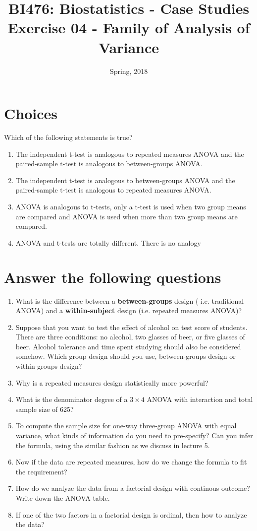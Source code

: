 \documentclass[a4paper,11pt]{article}
\title{\small{BI476: Biostatistics - Case Studies}\\
	\Large{Exercise 04 - Family of Analysis of Variance}
}
\author{Spring, 2018}
\date{}
\begin{document}
\begin{CJK*}{UTF8}{gbsn}
\maketitle


\section{Choices}
Which of the following statements is true?
\begin{enumerate}[A]
	\item The independent t-test is analogous to repeated measures ANOVA and 
		the paired-sample t-test is analogous to between-groups ANOVA.
	\item The independent t-test is analogous to between-groups ANOVA and the 
		paired-sample t-test is analogous to repeated measures ANOVA.
	\item ANOVA is analogous to t-tests, only a t-test is used when two group 
		means are compared and ANOVA is used when more than two group 
		means are compared.
	\item ANOVA and t-tests are totally different. There is no analogy
\end{enumerate}

\section{Answer the following questions}
\begin{enumerate}[(1)]
	\item What is the difference between a \textbf{between-groups} design (
		i.e. traditional ANOVA) and a \textbf{within-subject} design (i.e. 
		repeated measures ANOVA)?
	\item Suppose that you want to test the effect of alcohol on test score of 
		students. There are three conditions: no alcohol, two glasses of 
		beer, or five glasses of beer. Alcohol tolerance and time spent 
		studying should also be considered somehow. Which group design should 
		you use, between-groups design or within-groups design?
	\item Why is a repeated measures design statistically more powerful?
	\item What is the denominator degree of a $3\times 4$ ANOVA with interaction and 
		total sample size of 625? 
	\item To compute the sample size for one-way three-group ANOVA with equal variance, 
		what kinds of information do you need to pre-specify? Can you infer the 
		formula, using the similar fashion as we discuss in lecture 5.
	\item Now if the data are repeated measures, how do we change the formula to fit 
		the requirement? 
	\item How do we analyze the data from a factorial design with continous outcome?
		Write down the ANOVA table.
	\item If one of the two factors in a factorial design is ordinal, then how to 
		analyze the data?
\end{enumerate}


\end{CJK*}
\end{document}
